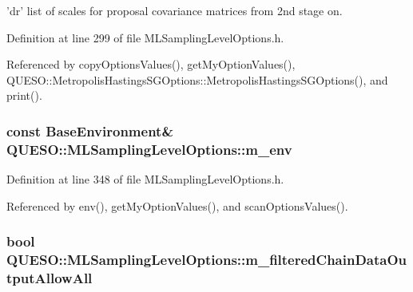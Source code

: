 'dr' list of scales for proposal covariance matrices from 2nd stage on. 



Definition at line 299 of file M\-L\-Sampling\-Level\-Options.\-h.



Referenced by copy\-Options\-Values(), get\-My\-Option\-Values(), Q\-U\-E\-S\-O\-::\-Metropolis\-Hastings\-S\-G\-Options\-::\-Metropolis\-Hastings\-S\-G\-Options(), and print().

\hypertarget{class_q_u_e_s_o_1_1_m_l_sampling_level_options_a5bdc1fb3f6eb46f73feec9c356c9a1b8}{
\subsubsection[{m\-\_\-env}]{\setlength{\rightskip}{0pt plus 5cm}const {\bf Base\-Environment}\& Q\-U\-E\-S\-O\-::\-M\-L\-Sampling\-Level\-Options\-::m\-\_\-env\hspace{0.3cm}{\ttfamily [private]}}}\label{class_q_u_e_s_o_1_1_m_l_sampling_level_options_a5bdc1fb3f6eb46f73feec9c356c9a1b8}


Definition at line 348 of file M\-L\-Sampling\-Level\-Options.\-h.



Referenced by env(), get\-My\-Option\-Values(), and scan\-Options\-Values().

\hypertarget{class_q_u_e_s_o_1_1_m_l_sampling_level_options_a80471ba2c70d39f2cb7e1ea954fb86b8}{
\subsubsection[{m\-\_\-filtered\-Chain\-Data\-Output\-Allow\-All}]{\setlength{\rightskip}{0pt plus 5cm}bool Q\-U\-E\-S\-O\-::\-M\-L\-Sampling\-Level\-Options\-::m\-\_\-filtered\-Chain\-Data\-Output\-Allow\-All}}\label{class_q_u_e_s_o_1_1_m_l_sampling_level_options_a80471ba2c70d39f2cb7e1ea954fb86b8}


